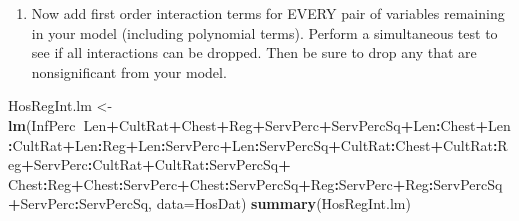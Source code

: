 \documentclass[]{article}
\newenvironment{Shaded}{\begin{snugshade}}{\end{snugshade}}
\newcommand{\KeywordTok}[1]{\textcolor[rgb]{0.13,0.29,0.53}{\textbf{#1}}}
\newcommand{\DataTypeTok}[1]{\textcolor[rgb]{0.13,0.29,0.53}{#1}}
\newcommand{\StringTok}[1]{\textcolor[rgb]{0.31,0.60,0.02}{#1}}
\newcommand{\OperatorTok}[1]{\textcolor[rgb]{0.81,0.36,0.00}{\textbf{#1}}}
\newcommand{\NormalTok}[1]{#1}
\providecommand{\tightlist}{%
  \setlength{\itemsep}{0pt}\setlength{\parskip}{0pt}}
\begin{document}
\begin{enumerate}
\def\labelenumi{\Alph{enumi})}
\setcounter{enumi}{6}
\tightlist
\item
  Now add first order interaction terms for EVERY pair of variables
  remaining in your model (including polynomial terms). Perform a
  simultaneous test to see if all interactions can be dropped. Then be
  sure to drop any that are nonsignificant from your model.
\end{enumerate}

\begin{Shaded}
\begin{Highlighting}[]
\NormalTok{HosRegInt.lm <-}\StringTok{ }\KeywordTok{lm}\NormalTok{(InfPerc}\OperatorTok{~}\NormalTok{Len}\OperatorTok{+}\NormalTok{CultRat}\OperatorTok{+}\NormalTok{Chest}\OperatorTok{+}\NormalTok{Reg}\OperatorTok{+}\NormalTok{ServPerc}\OperatorTok{+}\NormalTok{ServPercSq}\OperatorTok{+}\NormalTok{Len}\OperatorTok{:}\NormalTok{Chest}\OperatorTok{+}\NormalTok{Len}\OperatorTok{:}\NormalTok{CultRat}\OperatorTok{+}\NormalTok{Len}\OperatorTok{:}\NormalTok{Reg}\OperatorTok{+}\NormalTok{Len}\OperatorTok{:}\NormalTok{ServPerc}\OperatorTok{+}\NormalTok{Len}\OperatorTok{:}\NormalTok{ServPercSq}\OperatorTok{+}\NormalTok{CultRat}\OperatorTok{:}\NormalTok{Chest}\OperatorTok{+}\NormalTok{CultRat}\OperatorTok{:}\NormalTok{Reg}\OperatorTok{+}\NormalTok{ServPerc}\OperatorTok{:}\NormalTok{CultRat}\OperatorTok{+}\NormalTok{CultRat}\OperatorTok{:}\NormalTok{ServPercSq}\OperatorTok{+}\StringTok{ }\NormalTok{Chest}\OperatorTok{:}\NormalTok{Reg}\OperatorTok{+}\NormalTok{Chest}\OperatorTok{:}\NormalTok{ServPerc}\OperatorTok{+}\NormalTok{Chest}\OperatorTok{:}\NormalTok{ServPercSq}\OperatorTok{+}\NormalTok{Reg}\OperatorTok{:}\NormalTok{ServPerc}\OperatorTok{+}\NormalTok{Reg}\OperatorTok{:}\NormalTok{ServPercSq}\OperatorTok{+}\NormalTok{ServPerc}\OperatorTok{:}\NormalTok{ServPercSq, }\DataTypeTok{data=}\NormalTok{HosDat)}
\KeywordTok{summary}\NormalTok{(HosRegInt.lm)}
\end{Highlighting}
\end{Shaded}
\end{document}
